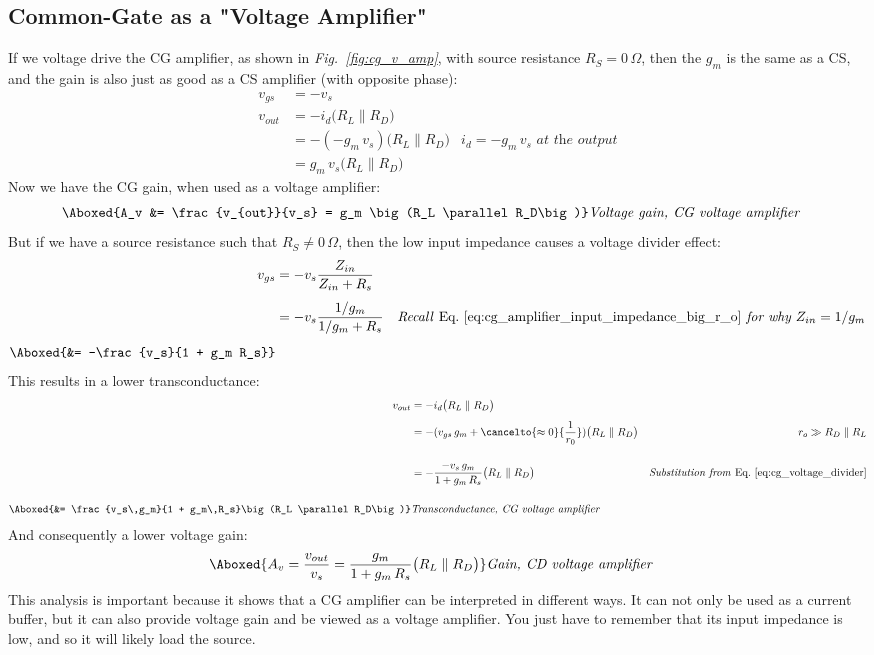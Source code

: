 \subsection{Common-Gate as a "Voltage Amplifier"}
If we voltage drive the CG amplifier, as shown in \emph{Fig.~\ref{fig:cg_v_amp}}, with source resistance $R_S = 0\,\Omega$, then the $g_m$ is the same as a CS, and the gain is also just as good as a CS amplifier (with opposite phase):
    \begin{align*}
        v_{gs} &= -v_s\\[0.35cm] 
        v_{out} &= - i_d \big(R_L \parallel R_D\big)\\[0.15cm]
        &= -(-g_m\,v_s)\big(R_L \parallel R_D\big) &\textit{$i_d = -g_m\,v_s$ at the output}\\[0.15cm]
        &= g_m\,v_s \big(R_L \parallel R_D\big)
    \end{align*}
Now we have the CG gain, when used as a voltage amplifier:
    \begin{align}
        \Aboxed{A_v &= \frac{v_{out}}{v_s} = g_m \big(R_L \parallel R_D\big)} &\textit{Voltage gain, CG voltage amplifier}
        \label{eq:cg_voltage_amp_gain}
    \end{align}
But if we have a source resistance such that $R_S \ne 0\,\Omega$, then the low input impedance causes a voltage divider effect:
    \begin{align}
        v_{gs} &= -v_s \frac{Z_{in}}{Z_{in} + R_s}\\[0.15cm]
        &= -v_s \frac{1/g_m}{1/g_m + R_s}
        &\textit{Recall \emph{Eq.~\ref{eq:cg_amplifier_input_impedance_big_r_o}} for why $Z_{in} = 1/g_m$}\\[0.15cm]
        \Aboxed{&= -\frac{v_s}{1 + g_m R_s}}
        \label{eq:cg_voltage_divider}
    \end{align}
This results in a lower transconductance:
    \begin{align}
        v_{out} &= -i_d\big(R_L \parallel R_D\big)\\[0.15cm]
        &= -(v_{gs}\,g_m + \cancelto{\approx0}{\frac{1}{r_0}})\big(R_L \parallel R_D\big)
        &\textit{$r_o \gg R_D \parallel R_L$}\\[0.45cm]
        &= -\frac{-v_s\,g_m}{1 + g_m\,R_s}\big(R_L \parallel R_D\big)
        &\textit{Substitution from \emph{Eq.~\ref{eq:cg_voltage_divider}}}\\[0.45cm]
        \Aboxed{&= \frac{v_s\,g_m}{1 + g_m\,R_s}\big(R_L \parallel R_D\big)} &\textit{Transconductance, CG voltage amplifier}
    \end{align}
And consequently a lower voltage gain: 
    \begin{align}
        \Aboxed{A_v = \frac{v_{out}}{v_s} = \frac{g_m}{1 + g_m\,R_s}\big(R_L \parallel R_D\big)} &\textit{Gain, CD voltage amplifier}
    \end{align}
This analysis is important because it shows that a CG amplifier can be interpreted in different ways.  It can not only be used as a current buffer, but it can also provide voltage gain and be viewed as a voltage amplifier.  You just have to remember that its input impedance is low, and so it will likely load the source.


